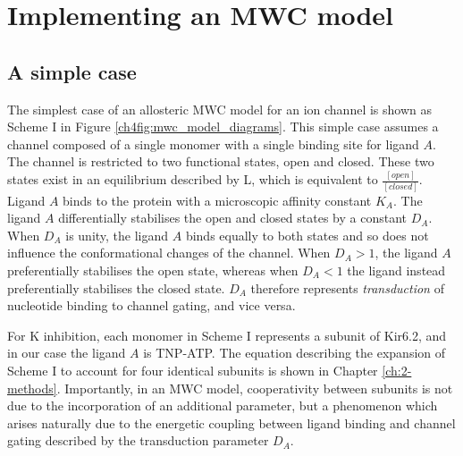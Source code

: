 \section{Implementing an MWC model}

\subsection{A simple case}

The simplest case of an allosteric MWC model for an ion channel is shown as Scheme I in Figure \ref{ch4fig:mwc_model_diagrams}.
This simple case assumes a channel composed of a single monomer with a single binding site for ligand $A$.
The channel is restricted to two functional states, open and closed.
These two states exist in an equilibrium described by L, which is equivalent to $\frac{[open]}{[closed]}$.
Ligand $A$ binds to the protein with a microscopic affinity constant $K_A$.
The ligand $A$ differentially stabilises the open and closed states by a constant $D_A$.
When $D_A$ is unity, the ligand $A$ binds equally to both states and so does not influence the conformational changes of the channel.
When $D_A>1$, the ligand $A$ preferentially stabilises the open state, whereas when $D_A<1$ the ligand instead preferentially stabilises the closed state.
$D_A$ therefore represents \textit{transduction} of nucleotide binding to channel gating, and vice versa.

For K\ATP{} inhibition, each monomer in Scheme I represents a subunit of Kir6.2, and in our case the ligand $A$ is TNP-ATP.
The equation describing the expansion of Scheme I to account for four identical subunits is shown in Chapter \ref{ch:2-methods}.
Importantly, in an MWC model, cooperativity between subunits is not due to the incorporation of an additional parameter, but a phenomenon which arises naturally due to the energetic coupling between ligand binding and channel gating described by the transduction parameter $D_A$.

